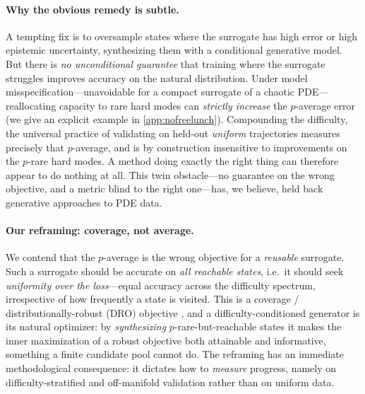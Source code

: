 \documentclass{article}
\theoremstyle{plain}
\theoremstyle{definition}
\theoremstyle{remark}
\newcommand{\pnat}{p}
\begin{document}
\paragraph{Why the obvious remedy is subtle.}
A tempting fix is to oversample states where the surrogate has high error or high epistemic uncertainty,
synthesizing them with a conditional generative model. But there is \emph{no unconditional guarantee}
that training where the surrogate struggles improves accuracy on the natural distribution. Under model
misspecification---unavoidable for a compact surrogate of a chaotic PDE---reallocating capacity to rare
hard modes can \emph{strictly increase} the $\pnat$-average error (we give an explicit example in
\cref{app:nofreelunch}). Compounding the difficulty, the universal practice of validating on held-out
\emph{uniform} trajectories measures precisely that $\pnat$-average, and is by construction insensitive
to improvements on the $\pnat$-rare hard modes. A method doing exactly the right thing can therefore
appear to do nothing at all. This twin obstacle---no guarantee on the wrong objective, and a metric
blind to the right one---has, we believe, held back generative approaches to PDE data.

\paragraph{Our reframing: coverage, not average.}
We contend that the $\pnat$-average is the wrong objective for a \emph{reusable} surrogate. Such a
surrogate should be accurate on \emph{all reachable states}, i.e.\ it should seek \emph{uniformity over
the loss}---equal accuracy across the difficulty spectrum, irrespective of how frequently a state is
visited. This is a coverage / distributionally-robust (DRO) objective
\citep{benTal2013dro,duchi2021dro,sagawa2020groupdro}, and a difficulty-conditioned generator is its
natural optimizer: by \emph{synthesizing} $\pnat$-rare-but-reachable states it makes the inner
maximization of a robust objective both attainable and informative, something a finite candidate pool
cannot do. The reframing has an immediate methodological consequence: it dictates how to \emph{measure}
progress, namely on difficulty-stratified and off-manifold validation rather than on uniform data.
\end{document}
